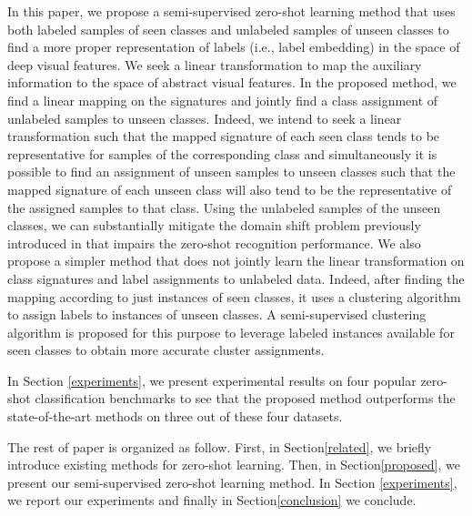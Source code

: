 \documentclass[10pt,twocolumn,letterpaper]{article}
\begin{document}
In this paper, we propose a semi-supervised zero-shot learning method that uses both labeled samples of seen classes and unlabeled samples of unseen classes to find a more proper representation of labels (i.e., label embedding) in the space of deep visual features. We seek a linear transformation to map the auxiliary information to the space of abstract visual features. In the proposed method, we find a linear mapping on the signatures and jointly find a class assignment of unlabeled samples to unseen classes. Indeed, we intend to seek a linear transformation such that the mapped signature of each seen class tends to be representative for samples of the corresponding class and simultaneously it is possible to find an assignment of unseen samples to unseen classes such that the mapped signature of  each unseen class will also tend to be the representative of the assigned samples to that class. 
Using the unlabeled samples of the unseen classes, we can substantially mitigate the domain shift problem previously introduced in \cite{eccv14} that impairs the zero-shot recognition performance. 
We also propose a simpler method that does not jointly learn the linear transformation on class signatures and label assignments to unlabeled data. Indeed, after finding the mapping according to just instances of seen classes, it uses a clustering algorithm to assign labels to instances of unseen classes. A semi-supervised clustering algorithm is proposed for this purpose to leverage labeled instances available for seen classes to obtain more accurate cluster assignments.

In Section \ref{experiments}, we present experimental results on four popular zero-shot classification benchmarks to see that the proposed method outperforms the state-of-the-art methods on three out of these four datasets.

The rest of paper is organized as follow. First, in Section\ref{related}, we briefly introduce existing methods for zero-shot learning.
Then, in Section\ref{proposed}, we present our semi-supervised zero-shot learning method. In Section \ref{experiments}, we report our experiments and finally in Section\ref{conclusion}
we conclude.
\end{document}
